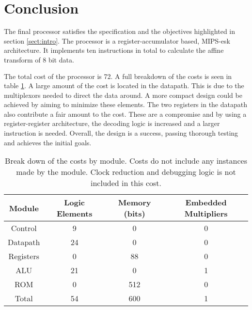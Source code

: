 

\section{Conclusion}

The final processor satisfies the specification and the objectives highlighted in section \ref{sect:intro}.
The processor is a register-accumulator based, MIPS-esk architecture. 
It implements ten instructions in total to calculate the affine transform of 8 bit data.

The total cost of the processor is 72.
A full breakdown of the costs is seen in table \ref{tab:costs}.
A large amount of the cost is located in the datapath. 
This is due to the multiplexors needed to direct the data around. 
A more compact design could be achieved by aiming to minimize these elements. 
The two registers in the datapath also contribute a fair amount to the cost. 
These are a compromise and by using a register-register architecture, the decoding logic is increased and a larger instruction is needed.
Overall, the design is a success, passing thorough testing and achieves the initial goals. 


\begin{table}
\caption{Break down of the costs by module. Costs do not include any instances made by the module. Clock reduction and debugging logic is not included in this cost.}
\label{tab:costs}
\begin{tabular}{cccc} \hline
Module		& Logic Elements	& Memory (bits)	& Embedded Multipliers \\ \hline
Control		& 9			& 0		& 0	\\
Datapath	& 24			& 0		& 0	\\
Registers	& 0			& 88		& 0	\\
ALU		& 21			& 0		& 1	\\
ROM		& 0			& 512		& 0 	\\ \hline
Total 		& 54			& 600		& 1 	\\ \hline
\end{tabular}
\end{table}


